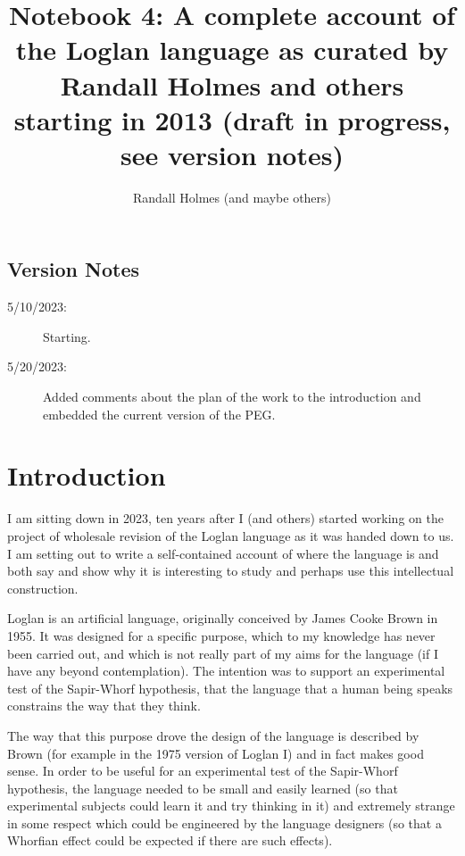 \documentclass[12pt]{article}
\title{Notebook 4:  A complete account of the Loglan language as curated by Randall Holmes and others starting in 2013 (draft in progress, see version notes)
}
\author{Randall Holmes (and maybe others)}
\begin{document}
\maketitle

\tableofcontents

\newpage

\subsection{Version Notes}

\begin{description}

\item[5/10/2023:]  Starting.

\item[5/20/2023:]  Added comments about the plan of the work to the introduction and embedded the current version of the PEG.

\end{description}

\newpage

\section{Introduction}

I am sitting down in 2023, ten years after I (and others) started working on the project of wholesale revision of the Loglan language as it was handed down to us.  I am setting out to write a self-contained account of where the language is and both say and show why it is interesting to study and perhaps use this intellectual construction.

Loglan is an artificial language, originally conceived by James Cooke Brown in 1955.  It was designed for a specific purpose, which to my knowledge has never been carried out, and which is not really part of my aims for the language (if I have any beyond contemplation).  The intention was to support an experimental test of the Sapir-Whorf hypothesis, that the language that a human being speaks constrains the way that they think.

The way that this purpose drove the design of the language is described by Brown (for example in the 1975 version of Loglan I) and in fact makes good sense.  In order to be useful for an experimental test of the Sapir-Whorf hypothesis, the language needed to be small and easily learned (so that experimental subjects could learn it and try thinking in it) and extremely strange in some respect which could be engineered by the language designers (so that a Whorfian effect could be expected if there are such effects).
\end{document}
